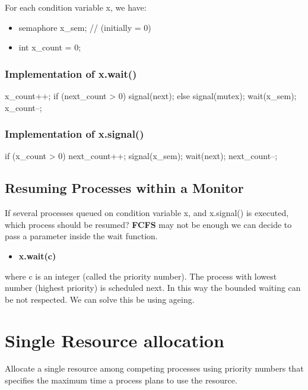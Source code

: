 For each condition variable x, we have:

\begin{itemize}
    \item semaphore x\_sem; // (initially = 0)
    \item int x\_count = 0;
\end{itemize}

\subsubsection{Implementation of x.wait() }

\begin{codeInC}
x_count++;
if (next_count > 0)
    signal(next);
else
    signal(mutex);
wait(x_sem);
x_count--;
\end{codeInC}

\subsubsection{Implementation of x.signal() }

\begin{codeInC}
if (x_count > 0) {
    next_count++;
    signal(x_sem);
    wait(next);
    next_count--;
}
\end{codeInC}

\subsection{Resuming Processes within a Monitor}
If several processes queued on condition variable x, and x.signal() is executed, which process should be resumed? \textbf{FCFS} may not be enough we can decide to pass a parameter inside the wait function.

\begin{itemize}
\centering
    \item[] \textbf{x.wait(c)}
\end{itemize}

where c is an integer (called the priority number). The process with lowest number (highest priority) is scheduled next. In this way the bounded waiting can be not respected. We can solve this be using ageing.

\newpage
\section{Single Resource allocation}
Allocate a single resource among competing processes using priority
numbers that specifies the maximum time a process plans to use the
resource.

